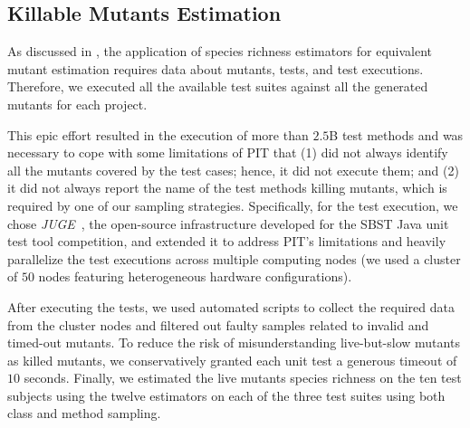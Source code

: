 \documentclass[sigconf,review,anonymous]{acmart}
\newcommand{\estimatorCount}{twelve\xspace}
\newcommand{\projectCount}{ten\xspace}
\newcommand{\PIT}{\textsc{PIT}\xspace}
\begin{document}
\subsection{Killable Mutants Estimation}
\label{sec:estimation}
As discussed in , the application of species richness
estimators for equivalent mutant estimation requires data about mutants, tests, and test executions.
%
Therefore, we executed all the available test suites against all the generated mutants for each project.

This epic effort resulted in the execution of more than $2.5$B test methods
and was necessary to cope with some limitations of \PIT that 
(1) did not always identify all the mutants covered by the test cases; hence, it did not execute them;
and (2) it did not always report the name of the test methods killing mutants, which is required by one of our sampling strategies.
%
Specifically, for the test execution, we chose \emph{JUGE}~\cite{DBLP:journals/corr/abs-2106-07520},
the open-source infrastructure developed for the SBST Java unit test tool competition, and extended it to address \PIT's limitations and heavily parallelize the test executions across multiple computing nodes (we used a cluster of $50$ nodes featuring heterogeneous hardware configurations).

After executing the tests, we used automated scripts to collect the required data from
the cluster nodes and  %
filtered out faulty samples related to invalid and timed-out mutants.
%
To reduce the risk of misunderstanding live-but-slow mutants as killed mutants,
we conservatively granted each unit test a generous timeout of $10$ seconds.
%
%
Finally, we estimated the live mutants species richness
on the \projectCount test subjects using the \estimatorCount 
estimators on each of the three test suites using both class and method sampling.
%
\end{document}
